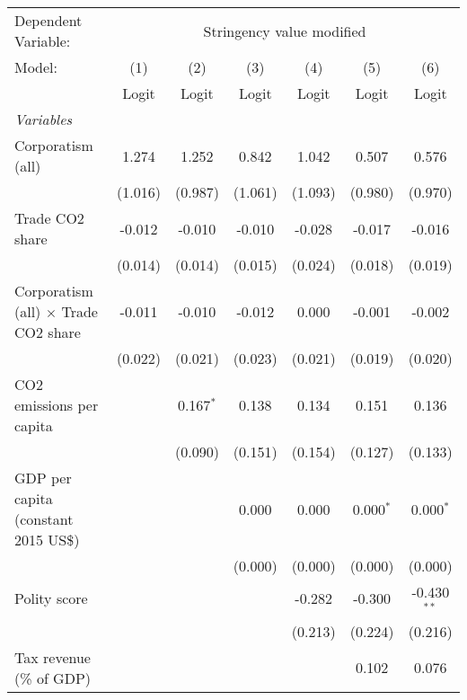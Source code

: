 
\begingroup
\centering
\begin{tabular}{lcccccc}
   \toprule
   Dependent Variable: & \multicolumn{6}{c}{Stringency value modified}\\
   Model:                                      & (1)     & (2)         & (3)     & (4)     & (5)         & (6)\\  
                                               &  Logit  & Logit       & Logit   & Logit   & Logit       & Logit\\  
   \midrule
   \emph{Variables}\\
   Corporatism (all)                           & 1.274   & 1.252       & 0.842   & 1.042   & 0.507       & 0.576\\   
                                               & (1.016) & (0.987)     & (1.061) & (1.093) & (0.980)     & (0.970)\\   
   Trade CO2 share                             & -0.012  & -0.010      & -0.010  & -0.028  & -0.017      & -0.016\\   
                                               & (0.014) & (0.014)     & (0.015) & (0.024) & (0.018)     & (0.019)\\   
   Corporatism (all) $\times$ Trade CO2 share  & -0.011  & -0.010      & -0.012  & 0.000   & -0.001      & -0.002\\   
                                               & (0.022) & (0.021)     & (0.023) & (0.021) & (0.019)     & (0.020)\\   
   CO2 emissions per capita                    &         & 0.167$^{*}$ & 0.138   & 0.134   & 0.151       & 0.136\\   
                                               &         & (0.090)     & (0.151) & (0.154) & (0.127)     & (0.133)\\   
   GDP per capita (constant 2015 US\$)         &         &             & 0.000   & 0.000   & 0.000$^{*}$ & 0.000$^{*}$\\   
                                               &         &             & (0.000) & (0.000) & (0.000)     & (0.000)\\   
   Polity score                                &         &             &         & -0.282  & -0.300      & -0.430$^{**}$\\   
                                               &         &             &         & (0.213) & (0.224)     & (0.216)\\   
   Tax revenue (\% of GDP)                     &         &             &         &         & 0.102       & 0.076\\   

\end{tabular}
